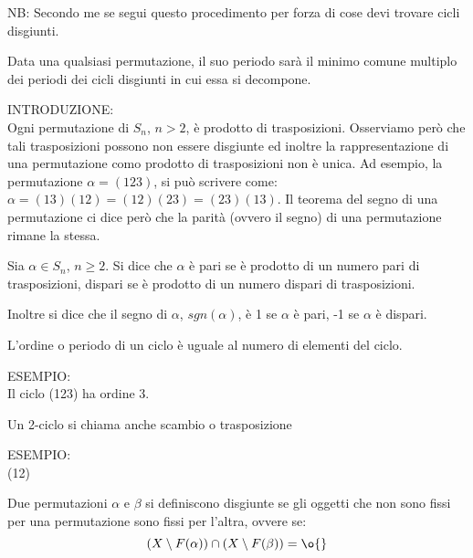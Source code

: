 NB: Secondo me se segui questo procedimento per forza di cose devi trovare cicli disgiunti.

\begin{definizione}
	Data una qualsiasi permutazione, il suo periodo sarà il minimo comune multiplo dei periodi dei cicli disgiunti in cui essa si decompone. 
\end{definizione}

INTRODUZIONE: \\
Ogni permutazione di $S_n$, $n>2$, è prodotto di trasposizioni. Osserviamo però che tali trasposizioni possono non essere
disgiunte ed inoltre la rappresentazione di una permutazione como prodotto di trasposizioni non è unica. Ad esempio, la permutazione
$\alpha=(123)$, si può scrivere come: $\alpha=(13)(12)=(12)(23)=(23)(13)$. Il teorema del segno di una permutazione ci dice
però che la parità (ovvero il segno) di una permutazione rimane la stessa.

\begin{definizione}
	Sia $\alpha \in S_n$, $n \geq 2$. Si dice che $\alpha$ è pari se è prodotto di un numero pari di trasposizioni, dispari se è prodotto di un 
	numero dispari di trasposizioni.
	
	Inoltre si dice che il segno di $\alpha$, $sgn(\alpha)$, è 1 se $\alpha$ è pari, -1 se $\alpha$ è dispari.
\end{definizione}

\begin{definizione}
	L'ordine o periodo di un ciclo è uguale al numero di elementi del ciclo.
\end{definizione}

ESEMPIO: \\
Il ciclo (123) ha ordine 3.



\begin{definizione}
	Un 2-ciclo si chiama anche scambio o trasposizione
\end{definizione}

ESEMPIO: \\
(12)

\begin{definizione}
	Due permutazioni $\alpha$ e $\beta$ si definiscono disgiunte se gli oggetti che non sono fissi per una permutazione
	sono fissi per l'altra, ovvere se:
	\[
	(X \setminus F(\alpha))\cap (X \setminus F(\beta))=\o{}
	\]
\end{definizione}

